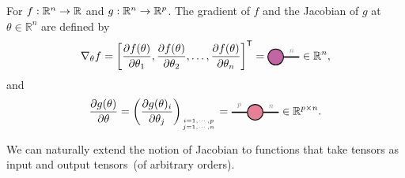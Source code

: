 \begin{definition}
  For $f:\mathbb{R}^n\to\mathbb{R}$ and $g:\mathbb{R}^n\to\mathbb{R}^p$. The gradient of $f$ and the Jacobian of $g$ at $\theta\in\mathbb{R}^n$ are defined by
    $$\nabla_\theta f = \left[\frac{\partial f(\theta)}
{\partial\theta_1},\frac{\partial f(\theta)}{\partial\theta_2},\dots,\frac{\partial f(\theta)} 
    {\partial\theta_n}\right]^\ts
        =
    \begin{tikzpicture}[baseline=\baseline]
    \tikzset{tensor/.style = {minimum size = 0.5cm,shape = circle,thick,draw=black,inner sep = 0pt}, edge/.style   = {thick,line width=.4mm}}
    \def\y{0}
     \def\x{0}
    \node[tensor,fill=blue!40!red!60!white] (a1) at (\x,\y){};
    \draw[edge](a1) -- (\x+0.75,\y)node [midway, above]{\edgelabel{$n$}};
    \end{tikzpicture} \in\mathbb{R}^n,$$
    and 
    $$\frac{\partial g(\theta)}{\partial\theta} = \left(\frac{\partial g(\theta)_i}{\partial\theta_j}\right)_{i=1,\cdots,p\atop j=1,\cdots, n}
    =
    \begin{tikzpicture}[baseline=\baseline]
    \tikzset{tensor/.style = {minimum size = 0.5cm,shape = circle,thick,draw=black,inner sep = 0pt}, edge/.style   = {thick,line width=.4mm}}
    \def\y{0}
     \def\x{0}
    \node[tensor,fill=blue!20!red!50!white] (A) at (\x,\y){};
    \draw[edge](A) -- (\x+0.75,\y)node [midway, above]{\scalebox{0.7}{\dimcolor{$n$}}};
    \draw[edge](A) -- (\x-0.75,\y)node [midway, above]{\scalebox{0.7}{\dimcolor{$p$}}};
    \end{tikzpicture}\in\mathbb{R}^{p\times n}.$$  
\end{definition}
We can naturally extend the notion of Jacobian to functions that take tensors as input and output tensors~(of arbitrary orders).

